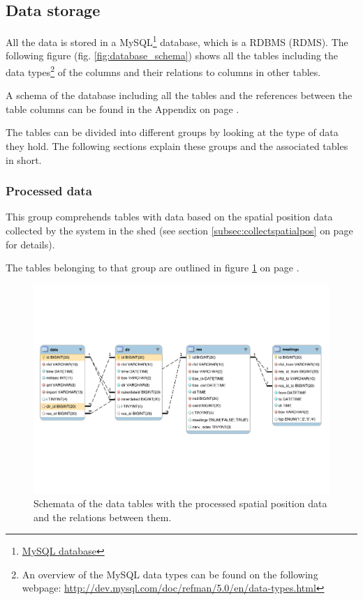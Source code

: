 \subsection{Data storage}
\label{subsec:datastorage}

All the data is stored in a MySQL\footnote{\href{http://www.mysql.com/}{MySQL database}} database, which is  a \acf{RDBMS} (RDMS). The following figure (fig. \ref{fig:database_schema}) shows all the tables including the data types\footnote{An overview of the MySQL data types can be found on the following webpage: \url{http://dev.mysql.com/doc/refman/5.0/en/data-types.html}} of the columns and their relations to columns in other tables. 

A schema of the database including all the tables and the references between the table columns can be found in the Appendix on page \pageref{fig:database_schema}.


The tables can be divided into different groups by looking at the type of data they hold. The following sections explain these groups and the associated tables in short.

\subsubsection{Processed data}

This group comprehends tables with data based on the spatial position data collected by the system in the shed (see section \ref{subsec:collectspatialpos} on page \pageref{subsec:collectspatialpos} for details).

The tables belonging to that group are outlined in figure \ref{fig:processed_data_schema} on page \pageref{fig:processed_data_schema}.
 
\begin{figure}[htpb]
\begin{center}
  \includegraphics[width=\textwidth]{assets/pdf/processed_data_schema.pdf}
  \caption[Schema of database tables with processed data]{Schemata of the data tables with the processed spatial position data and the relations between them.}
  \label{fig:processed_data_schema}
\end{center}
\end{figure}

